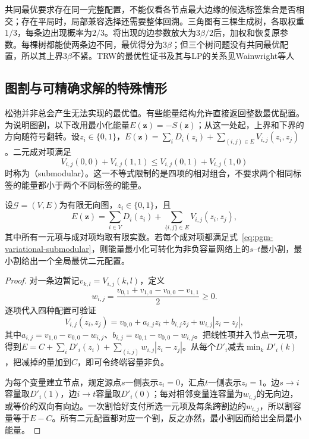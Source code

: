 共同最优要求存在同一完整配置，不能仅看各节点最大边缘的候选标签集合是否相交；存在平局时，局部兼容选择还需要整体回溯。三角图有三棵生成树，各取权重$1/3$，每条边出现概率为$2/3$。将出现的边参数放大为$3\beta/2$后，加权和恢复原参数。每棵树都能使两条边不同，最优得分为$3\beta$；但三个树问题没有共同最优配置，所以其上界$3\beta$不紧。TRW的最优性证书及其与LP的关系见Wainwright等人

\subsection{图割与可精确求解的特殊情形}
\label{sec:pgm-variational-graph-cut-special}
\label{sec:pgm-variational-graph-cuts}

松弛并非总会产生无法实现的最优值。有些能量结构允许直接返回整数最优配置。为说明图割，以下改用最小化能量$E(\bm z)=-S(\bm z)$；从这一处起，上界和下界的方向随符号翻转。设$z_i\in\{0,1\}$，$E(\bm z)=\sum_iD_i(z_i)+\sum_{(i,j)\in E}V_{i,j}(z_i,z_j)$。二元成对项满足
\begin{equation}
  V_{i,j}(0,0)+V_{i,j}(1,1)
    \leq V_{i,j}(0,1)+V_{i,j}(1,0)
  \label{eq:pgm-variational-submodular}
\end{equation}
时称为（submodular）。这一不等式限制的是四项的相对组合，不要求两个相同标签的能量都小于两个不同标签的能量。

\begin{theorem}[二元成对次模能量的图割表示]
  \label{thm:pgm-variational-cut}
  设$\mathcal G=(V,E)$为有限无向图，$z_i\in\{0,1\}$，且
  \[
    E(\bm z)=\sum_{i\in V}D_i(z_i)
      +\sum_{\{i,j\}\in E}V_{i,j}(z_i,z_j),
  \]
  其中所有一元项与成对项均取有限实数。若每个成对项都满足式~\eqref{eq:pgm-variational-submodular}，则能量最小化可转化为非负容量网络上的$s$--$t$最小割，最小割给出一个全局最优二元配置。
\end{theorem}
\begin{proof}
  对一条边暂记$v_{k,l}=V_{i,j}(k,l)$，定义
  \[
    w_{i,j}=\frac{v_{0,1}+v_{1,0}-v_{0,0}-v_{1,1}}2\geq0.
  \]
  逐项代入四种配置可验证
  \[
    V_{i,j}(z_i,z_j)
      =v_{0,0}+a_{i,j}z_i+b_{i,j}z_j
                   +w_{i,j}|z_i-z_j|,
  \]
  其中$a_{i,j}=v_{1,0}-v_{0,0}-w_{i,j}$、$b_{i,j}=v_{0,1}-v_{0,0}-w_{i,j}$。把线性项并入节点一元项，得到$E=C+\sum_iD'_i(z_i)+\sum_{(i,j)}w_{i,j}|z_i-z_j|$。从每个$D'_i$减去$\min_kD'_i(k)$，把减掉的量加到$C$，即可令终端容量非负。

  为每个变量建立节点，规定源点$s$一侧表示$z_i=0$，汇点$t$一侧表示$z_i=1$。边$s\to i$容量取$D'_i(1)$，边$i\to t$容量取$D'_i(0)$；每对相邻变量连容量为$w_{i,j}$的无向边，或等价的双向有向边。一次割恰好支付所选一元项及每条跨割边的$w_{i,j}$，所以割容量等于$E-C$。所有二元配置都对应一个割，反之亦然，最小割因而给出全局最小能量。
\end{proof}

